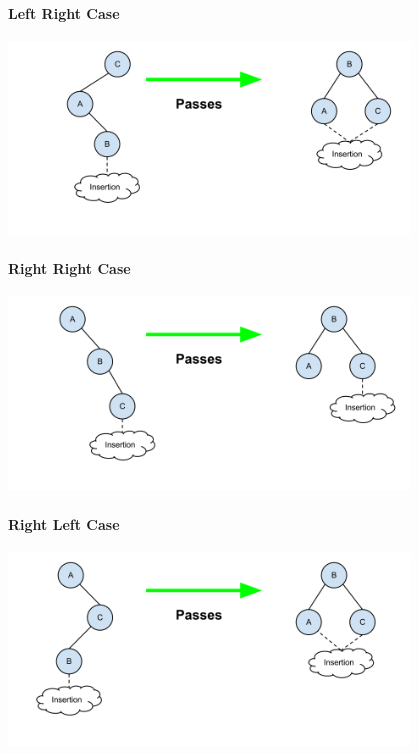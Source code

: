 \documentclass[12pt]{article}
\begin{document}
\paragraph{Left Right Case}
\begin{center}
\includegraphics[width=0.8\textwidth]{figures/avl-case2.png}
\end{center}
\paragraph{Right Right Case}
\begin{center}
\includegraphics[width=0.8\textwidth]{figures/avl-case3.png}
\end{center}
\paragraph{Right Left Case}
\begin{center}
\includegraphics[width=0.8\textwidth]{figures/avl-case4.png}
\end{center}
\end{document}
